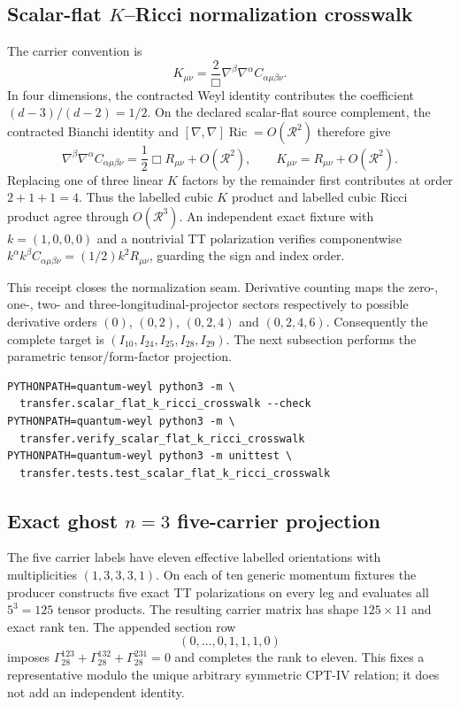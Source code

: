 \documentclass[11pt]{article}
\theoremstyle{definition}
\theoremstyle{remark}
\begin{document}
\subsection{Scalar-flat \texorpdfstring{$K$}{K}--Ricci normalization crosswalk}

The carrier convention is
\[
 K_{\mu\nu}=\frac{2}{\Box}\nabla^\beta\nabla^\alpha
 C_{\alpha\mu\beta\nu}.
\]
In four dimensions, the contracted Weyl identity contributes the coefficient
$(d-3)/(d-2)=1/2$.  On the declared scalar-flat source complement, the
contracted Bianchi identity and
$[\nabla,\nabla]\operatorname{Ric}=O(\mathcal R^2)$ therefore give
\[
 \nabla^\beta\nabla^\alpha C_{\alpha\mu\beta\nu}
 =\frac12\Box R_{\mu\nu}+O(\mathcal R^2),
 \qquad
 K_{\mu\nu}=R_{\mu\nu}+O(\mathcal R^2).
\]
Replacing one of three linear $K$ factors by the remainder first contributes
at order $2+1+1=4$.  Thus the labelled cubic $K$ product and labelled cubic
Ricci product agree through $O(\mathcal R^3)$.  An independent exact fixture
with $k=(1,0,0,0)$ and a nontrivial TT polarization verifies componentwise
$k^\alpha k^\beta C_{\alpha\mu\beta\nu}
=(1/2)k^2R_{\mu\nu}$, guarding the sign and index order.

This receipt closes the normalization seam.  Derivative counting maps
the zero-, one-, two- and three-longitudinal-projector sectors respectively
to possible derivative orders $(0)$, $(0,2)$, $(0,2,4)$ and $(0,2,4,6)$.
Consequently the complete target is
$(I_{10},I_{24},I_{25},I_{28},I_{29})$.  The next subsection performs the
parametric tensor/form-factor projection.

\begin{verbatim}
PYTHONPATH=quantum-weyl python3 -m \
  transfer.scalar_flat_k_ricci_crosswalk --check
PYTHONPATH=quantum-weyl python3 -m \
  transfer.verify_scalar_flat_k_ricci_crosswalk
PYTHONPATH=quantum-weyl python3 -m unittest \
  transfer.tests.test_scalar_flat_k_ricci_crosswalk
\end{verbatim}

\subsection{Exact ghost \texorpdfstring{$n=3$}{n=3} five-carrier projection}

The five carrier labels have eleven effective labelled orientations with
multiplicities $(1,3,3,3,1)$.  On each of ten generic momentum fixtures the
producer constructs five exact TT polarizations on every leg and evaluates
all $5^3=125$ tensor products.  The resulting carrier matrix has shape
$125\times11$ and exact rank ten.  The appended section row
\[
 (0,\ldots,0,1,1,1,0)
\]
imposes
$\Gamma_{28}^{123}+\Gamma_{28}^{132}+\Gamma_{28}^{231}=0$ and completes the
rank to eleven.  This fixes a representative modulo the unique arbitrary
symmetric CPT-IV relation; it does not add an independent identity.
\end{document}
